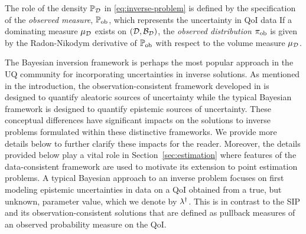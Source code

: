 \begin{defn}\label{defn:observed}
  The role of the density $\mathbb{P}_{\mathcal{D}}$ in \eqref{eq:inverse-problem} is defined by the specification of the \emph{observed measure}, $\operatorname*{\mathbb{P}_{ob}}$, which represents the uncertainty in QoI data
  If a dominating measure $\mu_{\mathcal{D}}$ exists on $(\mathcal{D}, \mathcal{B}_{\mathcal{D}})$, the \emph{observed distribution} $\operatorname*{\pi_{ob}}$ is given by the Radon-Nikodym derivative of $\operatorname*{\mathbb{P}_{ob}}$ with respect to the volume measure $\mu_{\mathcal{D}}$.
\end{defn}




The Bayesian inversion framework  is perhaps the most popular approach in the UQ community for incorporating uncertainties in inverse solutions.
As mentioned in the introduction, the observation-consistent framework developed in \cite{BJW18a, BJW18b, BWY20} is designed to quantify aleatoric sources of uncertainty while the typical Bayesian framework \cite{0266-5611-7-5-003,
 Kennedy_O_JRSSSB_2001,Tarantola_book, MNR07, CDS10,starktenorio,
 AlexanderianPetraStadlerEtAl14, Bui-ThanhGhattas14, Ernst2014,
 0266-5611-30-11-110301, ROM:CMW_2016,Stuart10,
 cockayneoatessullivangirolami} is designed to quantify epistemic sources of uncertainty.
These conceptual differences have significant impacts on the solutions to inverse problems formulated within these distinctive frameworks.
We provide more details below to further clarify these impacts for the reader.
Moreover, the details provided below play a vital role in Section~\ref{sec:estimation} where features of the data-consistent framework are used to motivate its extension to point estimation problems.
A typical Bayesian approach to an inverse problem focuses on first modeling epistemic uncertainties in data on a QoI obtained from a true, but unknown, parameter value, which we denote by $\lambda^\dagger$.
This is in contrast to the SIP and its observation-consistent solutions that are defined as pullback measures of an observed probability measure on the QoI.




